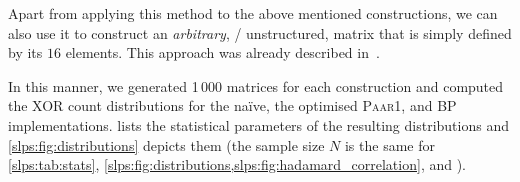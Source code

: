 Apart from applying this method to the above mentioned constructions, we can also use it to construct an \emph{arbitrary}, \ie/ unstructured, matrix that is simply defined by its $16$ elements.
This approach was already described in~\cite{ToSC:JPST17}.

In this manner, we generated 1\,000 matrices for each construction and computed the XOR count distributions for the na\"ive, the optimised \textsc{Paar1}, and \textsc{BP} implementations.
 lists the statistical parameters of the resulting distributions and \cref{slps:fig:distributions} depicts them (the sample size $N$ is the same for \cref{slps:tab:stats}, \cref{slps:fig:distributions,slps:fig:hadamard_correlation}, and
\cite[Appendix~A, Figures~3 to~6]{ToSC:KLSW17}%
).

